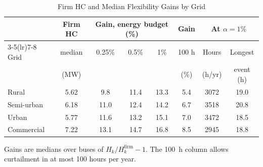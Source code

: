\begin{table}[t]
\centering
\caption{Firm HC and Median Flexibility Gains by Grid}
\label{tab:res}
\setlength{\tabcolsep}{2.5pt}
\begin{tabular}{lccccccc}
\toprule
 & Firm HC & \multicolumn{3}{c}{Gain, energy budget (\%)} & Gain & \multicolumn{2}{c}{At $\alpha=1\%$} \\
\cmidrule(lr){3-5}\cmidrule(lr){7-8}
Grid & median & 0.25\% & 0.5\% & 1\% & 100 h & Hours & Longest \\
 & (MW) & & & & (\%) & (h/yr) & event (h) \\
\midrule
Rural & 5.62 & 9.8 & 11.4 & 13.3 & 5.4 & 3072 & 19.0 \\
Semi-urban & 6.18 & 11.0 & 12.4 & 14.2 & 6.7 & 3518 & 20.8 \\
Urban & 5.77 & 11.6 & 13.2 & 15.1 & 7.0 & 3472 & 18.5 \\
Commercial & 7.22 & 13.1 & 14.7 & 16.8 & 8.5 & 2945 & 18.8 \\
\bottomrule
\end{tabular}
\vspace{2pt}
\begin{minipage}{\columnwidth}\footnotesize  Gains are medians over buses of $H_k/H_k^{\mathrm{firm}}-1$. The 100~h column allows curtailment in at most 100 hours per year.\end{minipage}
\end{table}
